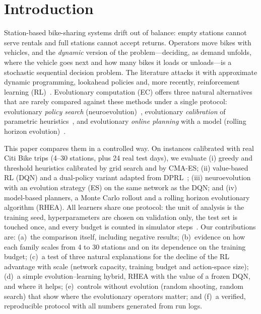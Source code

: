 \documentclass[conference,a4paper]{IEEEtran}
\begin{document}
\section{Introduction}
Station-based bike-sharing systems drift out of balance: empty stations cannot serve rentals and full stations cannot accept returns. Operators move bikes with
vehicles, and the \emph{dynamic} version of the problem---deciding, as demand unfolds, where the vehicle goes next and how many bikes it loads or unloads---is a
stochastic sequential decision problem. The literature attacks it with approximate dynamic programming, lookahead policies and, more recently, reinforcement learning
(RL)~\cite{seo2022,liang2024,brinkmann2019,guo2024}. Evolutionary computation (EC) offers three natural alternatives that are rarely compared against these
methods under a single protocol: evolutionary \emph{policy search} (neuroevolution)~\cite{salimans2017,such2017,bai2023}, evolutionary \emph{calibration} of
parametric heuristics~\cite{hansen2001}, and evolutionary \emph{online planning} with a model (rolling horizon evolution)~\cite{perezliebana2013}.

This paper compares them in a controlled way. On instances calibrated with real Citi Bike trips (4--30 stations, plus 24 real test days), we evaluate (i) greedy and
threshold heuristics calibrated by grid search and by CMA-ES; (ii) value-based RL (DQN) and a dual-policy variant adapted from DPRL~\cite{liang2024}; (iii) neuroevolution
with an evolution strategy (ES) on the same network as the DQN; and (iv) model-based planners, a Monte Carlo rollout and a rolling horizon evolutionary algorithm (RHEA).
All learners share one protocol: the unit of analysis is the training seed, hyperparameters are chosen on validation only, the test set is touched once, and every
budget is counted in simulator steps~\cite{henderson2018,agarwal2021}. Our contributions are: (a)~the comparison itself, including negative results;
(b)~evidence on how each family scales from 4 to 30 stations and on its dependence on the training budget; (c)~a test of three natural explanations for the decline of the
RL advantage with scale (network capacity, training budget and action-space size); (d)~a simple evolution--learning hybrid, RHEA with the value of a frozen DQN, and where it helps; (e)~controls without evolution (random shooting, random search) that show where the
evolutionary operators matter; and (f)~a verified, reproducible protocol with all numbers generated from run logs.
\end{document}
